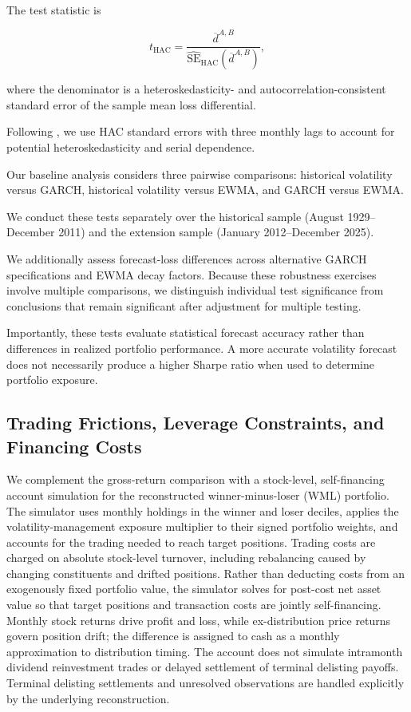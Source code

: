 \documentclass[11pt]{article}
\begin{document}
The test statistic is

\begin{equation}
    t_{\mathrm{HAC}}
    =
    \frac{\overline{d}^{A,B}}
    {\widehat{\mathrm{SE}}_{\mathrm{HAC}}
    (\overline{d}^{A,B})},
\end{equation}

where the denominator is a heteroskedasticity- and
autocorrelation-consistent standard error of the
sample mean loss differential.

Following \citet{newey1987simple}, we use HAC standard
errors with three monthly lags to account for potential
heteroskedasticity and serial dependence.

Our baseline analysis considers three pairwise comparisons:
historical volatility versus GARCH, historical volatility
versus EWMA, and GARCH versus EWMA.

We conduct these tests separately over the historical
sample (August 1929--December 2011) and the extension
sample (January 2012--December 2025).

We additionally assess forecast-loss differences across
alternative GARCH specifications and EWMA decay factors.
Because these robustness exercises involve multiple
comparisons, we distinguish individual test significance
from conclusions that remain significant after adjustment
for multiple testing.

Importantly, these tests evaluate statistical forecast
accuracy rather than differences in realized portfolio
performance. A more accurate volatility forecast does
not necessarily produce a higher Sharpe ratio when
used to determine portfolio exposure.

\subsection{Trading Frictions, Leverage Constraints, and Financing Costs}
\label{sec:implementation_method}
We complement the gross-return comparison with a stock-level, self-financing account simulation for the reconstructed winner-minus-loser (WML) portfolio. The simulator uses monthly holdings in the winner and loser deciles, applies the volatility-management exposure multiplier to their signed portfolio weights, and accounts for the trading needed to reach target positions. Trading costs are charged on absolute stock-level turnover, including rebalancing caused by changing constituents and drifted positions. Rather than deducting costs from an exogenously fixed portfolio value, the simulator solves for post-cost net asset value so that target positions and transaction costs are jointly self-financing. Monthly stock returns drive profit and loss, while ex-distribution price returns govern position drift; the difference is assigned to cash as a monthly approximation to distribution timing. The account does not simulate intramonth dividend reinvestment trades or delayed settlement of terminal delisting payoffs. Terminal delisting settlements and unresolved observations are handled explicitly by the underlying reconstruction.
\end{document}
